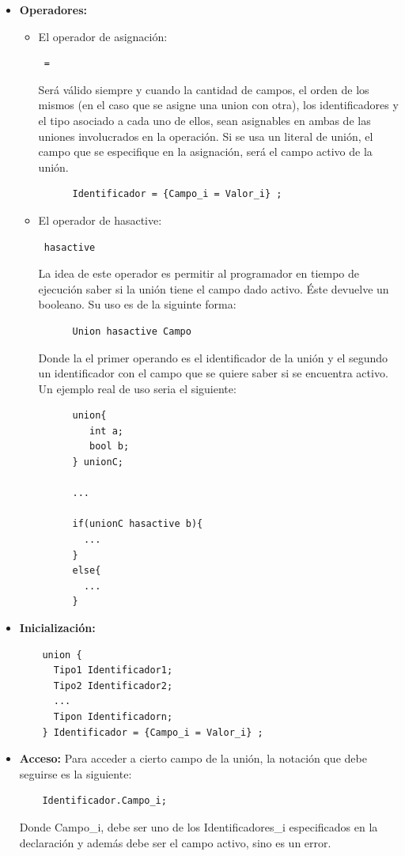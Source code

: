 \documentclass[11pt, spanish]{report}
\begin{document}
\begin{itemize}
\item \textbf{Operadores:}
  \begin{itemize}
  \item El operador de asignaci\'on: 
    \begin{verbatim} = \end{verbatim}
    Ser\'a v\'alido siempre y cuando la cantidad de campos, el orden de los mismos (en el caso que se asigne una union con otra), los identificadores y el tipo asociado a cada uno de ellos, sean asignables en ambas de las uniones involucrados en la operaci\'on. Si se usa un literal de unión, el campo que se especifique en la asignaci\'on, ser\'a el campo activo de la uni\'on.\\

    \begin{verbatim}
      Identificador = {Campo_i = Valor_i} ;
    \end{verbatim}

  \item El operador de hasactive: 
    \begin{verbatim} hasactive \end{verbatim}
    La idea de este operador es permitir al programador en tiempo de ejecuci\'on saber si la uni\'on tiene el campo dado activo. \'Este devuelve
un booleano. Su uso es de la siguinte forma:\\

    \begin{verbatim}
      Union hasactive Campo
    \end{verbatim}

   Donde la el primer operando es el identificador de la uni\'on y el segundo un identificador con el campo que se quiere saber si se encuentra activo.
Un ejemplo real de uso seria el siguiente:

    \begin{verbatim}
      union{
         int a;
         bool b;
      } unionC;

      ...

      if(unionC hasactive b){
        ...
      }
      else{
        ...
      }
    \end{verbatim}


  \end{itemize}
\item \textbf{Inicializaci\'on:}
  \begin{verbatim}
    union {
      Tipo1 Identificador1;
      Tipo2 Identificador2;
      ...
      Tipon Identificadorn;
    } Identificador = {Campo_i = Valor_i} ;
  \end{verbatim}
\item \textbf{Acceso:}
  Para acceder a cierto campo de la uni\'on, la notaci\'on que debe seguirse es la siguiente:
  \begin{verbatim}
    Identificador.Campo_i;
  \end{verbatim}

  Donde Campo\_i, debe ser uno de los Identificadores\_i especificados en la declaraci\'on y adem\'as debe ser el campo activo, sino es un error.
\end{itemize}
\end{document}
